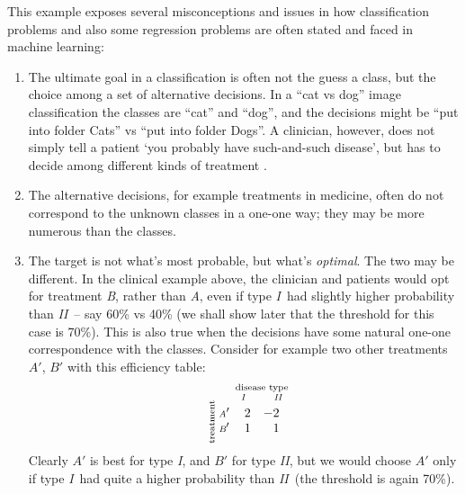 \documentclass[\ifafour a4paper,12pt,\else a5paper,10pt,\fi%
onecolumn,oneside,article,%
british%
]{memoir}
\theoremstyle{remark}
\theoremstyle{innote}
\renewcommand*{\|}[1][]{\nonscript\:#1\vert\nonscript\:\mathopen{}}
\newcommand*{\tI}{\textit{I}}
\newcommand*{\tII}{\textit{II}}
\newcommand*{\tA}{\textit{A}}
\newcommand*{\tB}{\textit{B}}
\begin{document}
\bigskip

This example exposes several misconceptions and issues in how classification problems and also some regression problems are often stated and faced in machine learning:
\begin{enumerate}[label=(\roman*),wide]
\item\label{item:choice_vs_guess} The ultimate goal in a classification is often not the guess a class, but the choice among a set of alternative decisions. In a \enquote{cat vs dog} image classification the classes are \enquote{cat} and \enquote{dog}, and the decisions might be \enquote{put into folder Cats} vs \enquote{put into folder Dogs}. A clinician, however, does not simply tell a patient \enquote*{you probably have such-and-such disease}, but has to decide among different kinds of treatment \autocites{soxetal1988_r2013,huninketal2001_r2014}.
\item The alternative decisions, for example treatments in medicine, often do not correspond to the unknown classes in a one-one way; they may be more numerous than the classes.
\item The target is not what's most probable, but what's \emph{optimal}. The two may be different. In the clinical example above, the clinician and patients would opt for treatment \tB, rather than \tA, even if type \tI\ had slightly higher probability than \tII\ -- say 60\% vs 40\% (we shall show later that the threshold for this case is 70\%). This is also true when the decisions have some natural one-one correspondence with the classes. Consider for example two other treatments $\tA'$, $\tB'$ with this efficiency table:
  \begin{equation*}
  {\text{\rotatebox[origin=c]{90}{\scriptsize treatment}}}\ 
  \begin{matrix} {\scriptsize\tA'}\\
    {\scriptsize\tB'}
  \end{matrix}\quad
  \overbracket[0pt]{
      \begin{matrix*}[r]
    2 & -2 \\ 1 & 1
      \end{matrix*}}^{
      \mathclap{\text{\parbox{8em}{\centering\scriptsize disease type\\\tI\hspace{2em}\hphantom{$-{}$}\tII}}
    }}
\end{equation*}
Clearly $\tA'$ is best for type \tI, and $\tB'$ for type \tII, but we would choose $\tA'$ only if type \tI\ had quite  a higher probability than \tII\ (the threshold is again 70\%).
\end{enumerate}
\end{document}
